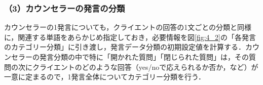 \documentclass[shuuron]{kuee}
\begin{document}
\subsubsection{（3）カウンセラーの発言の分類}






カウンセラーの1発言についても，クライエントの回答の1文ごとの分類と同様に，関連する単語をあらかじめ指定しておき，必要情報を図\ref{fig:4_2}の「各発言のカテゴリー分類」に引き渡し，発言データ分類の初期設定値を計算する．カウンセラーの発言分類の中で特に「開かれた質問」「閉じられた質問」は，その質問の次にクライエントのどのような回答（yes/noで応えられるか否か，など）が一意に定まるので，1発言全体についてカテゴリー分類を行う．





\end{document}
